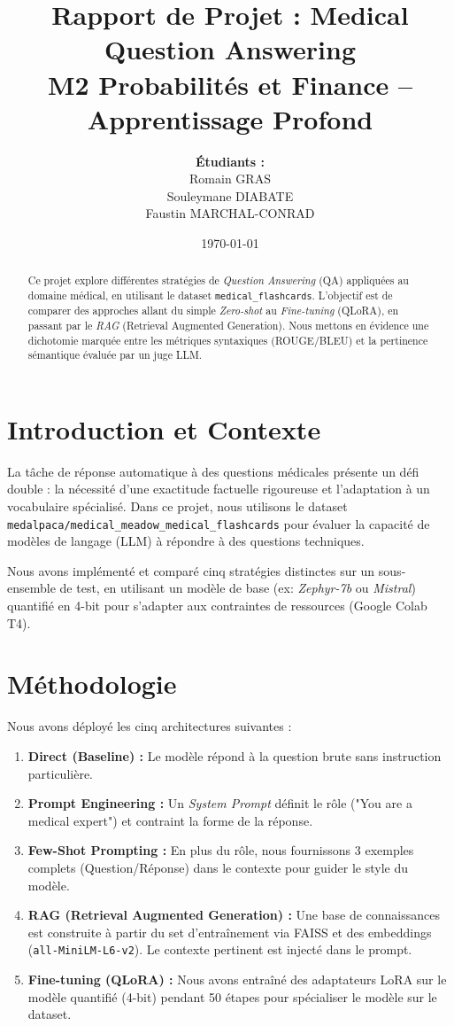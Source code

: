 \documentclass[a4paper,11pt]{article}
\title{\textbf{Rapport de Projet : Medical Question Answering}\\
\large M2 Probabilités et Finance -- Apprentissage Profond}
\author{\textbf{Étudiants :} \\ Romain GRAS \\ Souleymane DIABATE \\ Faustin MARCHAL-CONRAD}
\date{\today}
\begin{document}
\maketitle

\begin{abstract}
Ce projet explore différentes stratégies de \textit{Question Answering} (QA) appliquées au domaine médical, en utilisant le dataset \texttt{medical\_flashcards}. L'objectif est de comparer des approches allant du simple \textit{Zero-shot} au \textit{Fine-tuning} (QLoRA), en passant par le \textit{RAG} (Retrieval Augmented Generation). Nous mettons en évidence une dichotomie marquée entre les métriques syntaxiques (ROUGE/BLEU) et la pertinence sémantique évaluée par un juge LLM.
\end{abstract}

\tableofcontents
\newpage

\section{Introduction et Contexte}

La tâche de réponse automatique à des questions médicales présente un défi double : la nécessité d'une exactitude factuelle rigoureuse et l'adaptation à un vocabulaire spécialisé. Dans ce projet, nous utilisons le dataset \texttt{medalpaca/medical\_meadow\_medical\_flashcards} pour évaluer la capacité de modèles de langage (LLM) à répondre à des questions techniques.

Nous avons implémenté et comparé cinq stratégies distinctes sur un sous-ensemble de test, en utilisant un modèle de base (ex: \textit{Zephyr-7b} ou \textit{Mistral}) quantifié en 4-bit pour s'adapter aux contraintes de ressources (Google Colab T4).

\section{Méthodologie}

Nous avons déployé les cinq architectures suivantes :

\begin{enumerate}
    \item \textbf{Direct (Baseline) :} Le modèle répond à la question brute sans instruction particulière.
    \item \textbf{Prompt Engineering :} Un \textit{System Prompt} définit le rôle ("You are a medical expert") et contraint la forme de la réponse.
    \item \textbf{Few-Shot Prompting :} En plus du rôle, nous fournissons 3 exemples complets (Question/Réponse) dans le contexte pour guider le style du modèle.
    \item \textbf{RAG (Retrieval Augmented Generation) :} Une base de connaissances est construite à partir du set d'entraînement via FAISS et des embeddings (\texttt{all-MiniLM-L6-v2}). Le contexte pertinent est injecté dans le prompt.
    \item \textbf{Fine-tuning (QLoRA) :} Nous avons entraîné des adaptateurs LoRA sur le modèle quantifié (4-bit) pendant 50 étapes pour spécialiser le modèle sur le dataset.
\end{enumerate}
\end{document}

